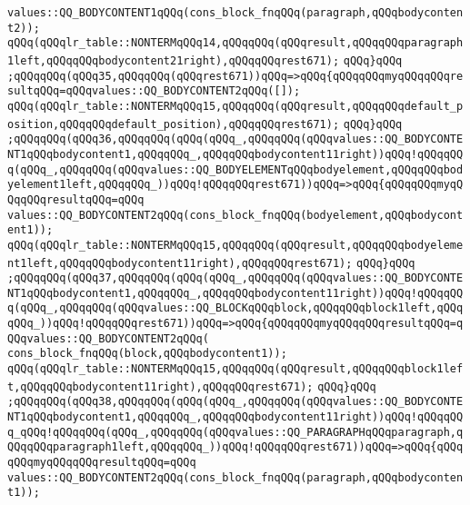 \verb|values::QQ_BODYCONTENT1qQQq(cons_block_fnqQQq(paragraph,qQQqbodycontent2));|\newline
\verb|qQQq(qQQqlr_table::NONTERMqQQq14,qQQqqQQq(qQQqresult,qQQqqQQqparagraph1left,qQQqqQQqbodycontent21right),qQQqqQQqrest671);|\newline
\verb|qQQq}qQQq|\newline
\verb|;qQQqqQQq(qQQq35,qQQqqQQq(qQQqrest671))qQQq=>qQQq{qQQqqQQqmyqQQqqQQqresultqQQq=qQQqvalues::QQ_BODYCONTENT2qQQq([]);|\newline
\verb|qQQq(qQQqlr_table::NONTERMqQQq15,qQQqqQQq(qQQqresult,qQQqqQQqdefault_position,qQQqqQQqdefault_position),qQQqqQQqrest671);|\newline
\verb|qQQq}qQQq|\newline
\verb|;qQQqqQQq(qQQq36,qQQqqQQq(qQQq(qQQq_,qQQqqQQq(qQQqvalues::QQ_BODYCONTENT1qQQqbodycontent1,qQQqqQQq_,qQQqqQQqbodycontent11right))qQQq!qQQqqQQq(qQQq_,qQQqqQQq(qQQqvalues::QQ_BODYELEMENTqQQqbodyelement,qQQqqQQqbodyelement1left,qQQqqQQq_))qQQq!qQQqqQQqrest671))qQQq=>qQQq{qQQqqQQqmyqQQqqQQqresultqQQq=qQQq|\newline
\verb|values::QQ_BODYCONTENT2qQQq(cons_block_fnqQQq(bodyelement,qQQqbodycontent1));|\newline
\verb|qQQq(qQQqlr_table::NONTERMqQQq15,qQQqqQQq(qQQqresult,qQQqqQQqbodyelement1left,qQQqqQQqbodycontent11right),qQQqqQQqrest671);|\newline
\verb|qQQq}qQQq|\newline
\verb|;qQQqqQQq(qQQq37,qQQqqQQq(qQQq(qQQq_,qQQqqQQq(qQQqvalues::QQ_BODYCONTENT1qQQqbodycontent1,qQQqqQQq_,qQQqqQQqbodycontent11right))qQQq!qQQqqQQq(qQQq_,qQQqqQQq(qQQqvalues::QQ_BLOCKqQQqblock,qQQqqQQqblock1left,qQQqqQQq_))qQQq!qQQqqQQqrest671))qQQq=>qQQq{qQQqqQQqmyqQQqqQQqresultqQQq=qQQqvalues::QQ_BODYCONTENT2qQQq(|\newline
\verb|cons_block_fnqQQq(block,qQQqbodycontent1));|\newline
\verb|qQQq(qQQqlr_table::NONTERMqQQq15,qQQqqQQq(qQQqresult,qQQqqQQqblock1left,qQQqqQQqbodycontent11right),qQQqqQQqrest671);|\newline
\verb|qQQq}qQQq|\newline
\verb|;qQQqqQQq(qQQq38,qQQqqQQq(qQQq(qQQq_,qQQqqQQq(qQQqvalues::QQ_BODYCONTENT1qQQqbodycontent1,qQQqqQQq_,qQQqqQQqbodycontent11right))qQQq!qQQqqQQq_qQQq!qQQqqQQq(qQQq_,qQQqqQQq(qQQqvalues::QQ_PARAGRAPHqQQqparagraph,qQQqqQQqparagraph1left,qQQqqQQq_))qQQq!qQQqqQQqrest671))qQQq=>qQQq{qQQqqQQqmyqQQqqQQqresultqQQq=qQQq|\newline
\verb|values::QQ_BODYCONTENT2qQQq(cons_block_fnqQQq(paragraph,qQQqbodycontent1));|\newline
